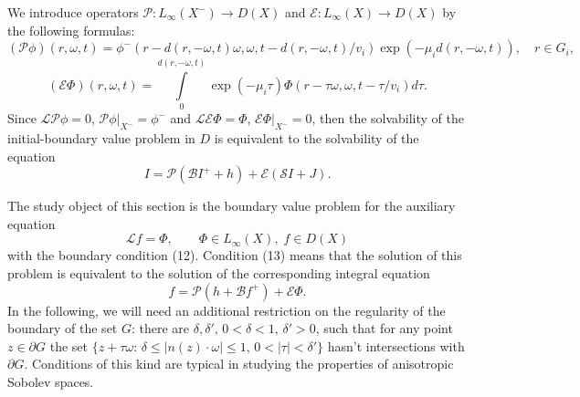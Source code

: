 \documentclass[12pt,reqno]{report}
\begin{document}
We introduce operators $\mathcal P: L_{\infty}(X^-) \to D(X)$ and $\mathcal E:  L_{\infty}(X) \to D(X)$ by the following formulas:
$$
(\mathcal P
\phi)(r,\omega,t)=\phi^-(r-d(r,-\omega,t)\omega,\omega,t-d(r,-\omega,t)/v_i)
\exp \left(- \mu_i d(r,-\omega,t)\right), \quad
r\in G_i,
$$
$$
(\mathcal E\Phi)(r,\omega,t)=\int \limits^{d(r,-\omega,t)}_0 \exp
\left(- \mu_i \tau\right) \Phi(r-\tau
\omega,\omega,t-\tau/v_i)d\tau.
$$
Since ${\mathcal L} {\mathcal P} \phi =0$, ${\mathcal P}
\phi|_{X^-} =\phi^-$ and ${\mathcal L} {\mathcal E} \Phi = \Phi$,
${\mathcal E} \Phi|_{X^-}=0$, then the solvability of the initial-boundary value problem 
in $D$ is equivalent to the solvability of the equation
\begin{equation}
I= \mathcal P(\mathcal B I^+ +h ) + \mathcal E ( \mathcal S I +
J).
\end{equation}

The study object of this section is the boundary value problem for the auxiliary equation
\begin{equation}
\mathcal Lf =\Phi, \qquad \Phi \in L_{\infty}(X), \; f \in D(X)
\end{equation}
with the boundary condition (12). 
Condition (13) means that the solution of this problem is equivalent to the solution of the corresponding integral equation 
\begin{equation}
f= \mathcal P (h+\mathcal B f^+) +{\mathcal E}\Phi.
\end{equation}
In the following, we will need an additional restriction on the regularity of the boundary of the set $G$: 
there are $\delta,\delta',\, 0< \delta < 1,\, \delta'>0$, such that for any point $z \in \partial G$ the set 
$\{z+\tau\omega:\, \delta \leq |n(z)\cdot \omega| \leq 1,\, 0 <|\tau| <\delta'\}$ hasn't intersections with $\partial G$. 
Conditions of this kind are typical in studying the properties of anisotropic Sobolev spaces.
\end{document}

